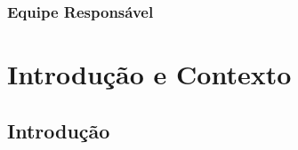 \usepackage{lipsum}
\usepackage{pdfpages} 

\renewcommand{\figurename}{Figura}
\renewcommand{\tablename}{Tabela}

\coverpage{\TITLE}{\SUBTITLE}{\AUTHOR}{\DATE}{\SUBJECT}
\newpage
\thispagestyle{empty}
\mbox{}

\newpage
\thispagestyle{empty}
\mbox{}

\newpage
\thispagestyle{empty}
\mbox{}


\newpage
\section*{Equipe Responsável}


\newpage
\thispagestyle{empty}
\mbox{}


\newpage


\newpage
\thispagestyle{empty}
\mbox{}


\newpage
\tableofcontents
\clearpage


\newpage
\part{Introdução e Contexto}

\newpage
\thispagestyle{empty}
\mbox{}


\chapter{Introdução} \label{ch:intro}

\clearpage  %


